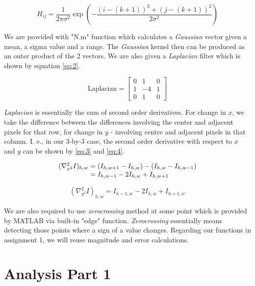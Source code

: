 \documentclass[lettersize,journal]{IEEEtran}
\begin{document}
\begin{equation}\label{eq:1}
    H_{ij}= \frac{1}{2\pi\sigma^2}\exp \left(-\frac{(i-(k+1))^2+(j-(k+1))^2}{2\sigma^2} \right)
\end{equation}

We are provided with "N.m" function which calculates a \emph{Gaussian} vector given a mean, a sigma value and a range. The \emph{Gaussian} kernel then can be produced as an outer product of the 2 vectors. We are also given a \emph{Laplacian} filter which is shown by equation \ref{eq:2}.

\begin{equation}\label{eq:2}
    \text{Laplacian}=\begin{bmatrix}0 & 1 & 0 \\ 1 & -4 & 1 \\ 0 & 1 & 0\end{bmatrix}
\end{equation}

\emph{Laplacian} is essentially the sum of second order derivatives. For change in $x$, we take the difference between the differences involving the center and adjacent pixels for that row, for change in $y$ - involving centre and adjacent pixels in that column. I. e., in our 3-by-3 case, the second order derivative with respect to $x$ and $y$ can be shown by \autoref{eq:3} and \autoref{eq:4}.

\begin{equation}\label{eq:3}
    \begin{array}{l@{{}={}}l}
        (\nabla_{x^2}^2I)_{h,w} & (I_{h,w+1}-I_{h,w}) - (I_{h,w} - I_{h,w-1}) \cr & I_{h,w-1}-2I_{h,w}+I_{h,w+1}
    \end{array}
\end{equation}

\begin{equation}\label{eq:4}
    (\nabla_{y^2}^2I)_{h,w}=I_{h-1,w}-2I_{h,w}+I_{h+1,w}
\end{equation}

We are also required to use \emph{zerocrossing} method at some point which is provided by MATLAB via built-in "edge" function. \emph{Zerocrossing} essentially means detecting those points where a sign of a value changes. Regarding our functions in assignment 1, we will reuse  magnitude and error calculations.

\section{Analysis Part 1}
\end{document}
